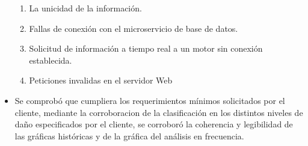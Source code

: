 \begin{itemize}
        \begin{enumerate}
            \item La unicidad de la información.
            \item Fallas de conexión con el microservicio de base de datos.
            \item Solicitud de información a tiempo real a un motor sin conexión
                establecida.
            \item Peticiones invalidas en el servidor Web
        \end{enumerate}
    \item Se comprobó que cumpliera
        los requerimientos mínimos solicitados por el cliente, mediante la
        corroboracion de la clasificación en los distintos niveles de daño
        especificados por el cliente, se corroboró la coherencia y legibilidad
        de las gráficas históricas y de la gráfica del análisis en frecuencia.
\end{itemize}



